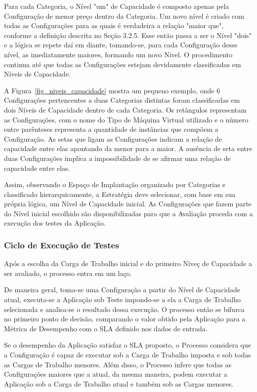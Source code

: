 Para cada Categoria, o Nível "um" de Capacidade é composto apenas pela Configuração 
de menor preço dentro da Categoria. Um novo nível é criado com todas as Configurações 
para as quais é verdadeira a relação "maior que", conforme a definição descrita 
no Seção 3.2.5. Esse então passa a ser o Nível "dois" e a lógica se repete daí em diante, 
tomando-se, para cada Configuração desse nível, as imediatamente maiores, 
formando um novo Nível. O procedimento continua até que todas as Configurações 
estejam devidamente classificadas em Níveis de Capacidade.

A Figura~\ref{fig_niveis_capacidade} mostra um pequeno exemplo, onde 6 Configurações
pertencentes a duas Categorias distintas foram classificadas em dois Níveis de 
Capacidade dentro de cada Categoria. Os retângulos representam as Configurações, 
com o nome do Tipo de Máquina Virtual utilizado e o número entre parênteses 
representa a quantidade de instâncias que compõem a Configuração. As setas que 
ligam as Configurações indicam a relação de capacidade entre elas apontando da 
menor para a maior. A ausência de seta entre duas Configurações implica a 
impossibilidade de se afirmar uma relação de capacidade entre elas. 

Assim, observando o Espaço de Implantação organizado por Categorias e classificado
hierarquicamente, a Estratégia deve selecionar, com base em sua própria lógica, um
Nível de Capacidade inicial. As Configurações que fazem parte do Nível inicial 
escolhido são disponibilizadas para que a Avaliação proceda com a execução dos 
testes da Aplicação.

\subsubsection{Ciclo de Execução de Testes}
Após a escolha da Carga de Trabalho inicial e do primeiro Níveç de Capacidade a
ser avaliado, o processo entra em um laço. 

De maneira geral, toma-se uma Configuração a partir do Nível de Capacidade atual, 
executa-se a Aplicação sob Teste impondo-se a ela a Carga de Trabalho selecionada 
e analisa-se o resultado dessa execução. O processo então se bifurca no primeiro
ponto de decisão, comparando o valor obtido pela Aplicação para a Métrica de 
Desempenho com o SLA definido nos dados de entrada.

Se o desempenho da Aplicação satisfaz o SLA proposto, o Processo considera que a
Configuração é capaz de executar sob a Carga de Trabalho imposta e sob todas as
Cargas de Trabalho menores. Além disso, o Processo infere que todas as 
Configurações maiores que a atual, da mesma maneira, podem executar
a Aplicação sob a Carga de Trabalho atual e também sob as Cargas menores. 

